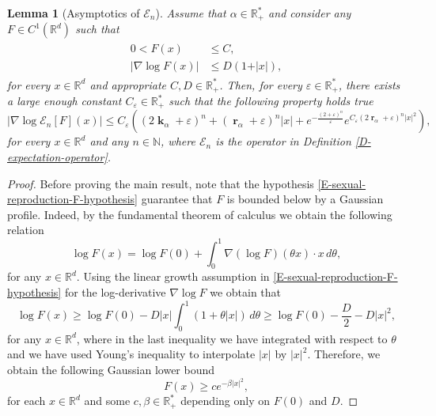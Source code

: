 \documentclass[reqno]{amsart}
\newtheorem{lemma}[definition]{Lemma}
\DeclareMathOperator{\bk}{\boldsymbol{k}}
\DeclareMathOperator{\br}{\boldsymbol{r}}
\numberwithin{equation}{section}
\begin{document}
{\begin{lemma}[Asymptotics of $\mathcal{E}_n$]\label{L-sexual-reproduction-weak-dependency}
Assume that $\alpha\in \mathbb{R}_+^*$ and consider any $F\in C^1(\mathbb{R}^d)$ such that
\begin{align}\label{E-sexual-reproduction-F-hypothesis}
\begin{aligned}
0<F(x)&\leq C,\\
\vert \nabla \log F(x)\vert&\leq D(1+\vert x\vert),
\end{aligned}
\end{align}
for every $x\in \mathbb{R}^d$ and appropriate $C,D\in \mathbb{R}_+^*$. Then, for every $\varepsilon\in \mathbb{R}_+^*$, there exists a large enough constant $C_\varepsilon\in \mathbb{R}_+^*$ such that the following property holds true
\begin{equation}\label{E-sexual-reproduction-weak-dependency}
\vert \nabla \log \mathcal{E}_n[F](x)\vert\leq C_\varepsilon\left((2\bk_\alpha+\varepsilon)^n+(\br_\alpha+\varepsilon)^n\vert x\vert+e^{-\frac{(2+\varepsilon)^n}{\varepsilon}}e^{C_\varepsilon(2\br_\alpha+\varepsilon)^n\vert x\vert^2}\right),
\end{equation}
for every $x\in \mathbb{R}^d$ and any $n\in \mathbb{N}$, where $\mathcal{E}_n$ is the operator in Definition \ref{D-expectation-operator}.
\end{lemma}

\begin{proof}
Before proving the main result, note that the hypothesis \eqref{E-sexual-reproduction-F-hypothesis} guarantee that $F$ is bounded below by a Gaussian profile. Indeed, by the fundamental theorem of calculus we obtain the following relation
$$\log F(x)= \log F(0)+\int_0^1\nabla (\log F)(\theta x)\cdot x\,d\theta,$$
for any $x\in \mathbb{R}^d$. Using the linear growth assumption in \eqref{E-sexual-reproduction-F-hypothesis} for the log-derivative $\nabla \log F$ we obtain that
$$
\log F(x)\geq \log F(0)-D\vert x\vert\int_0^1(1+\theta\vert x\vert)\,d\theta \geq \log F(0)-\frac{D}{2}-D\vert x\vert^2,
$$
for any $x\in \mathbb{R}^d$, where in the last inequality we have integrated with respect to $\theta$ and we have used Young's inequality to interpolate $\vert x\vert$ by $\vert x\vert^2$. Therefore, we obtain the following Gaussian lower bound
\begin{equation}\label{E-sexual-reproduction-F-hypothesis-lower}
F(x)\geq c e^{-\beta\vert x\vert^2},
\end{equation}
for each $x\in \mathbb{R}^d$ and some $c,\beta\in \mathbb{R}_+^*$ depending only on $F(0)$ and $D$. 


\end{proof}}
\end{document}
